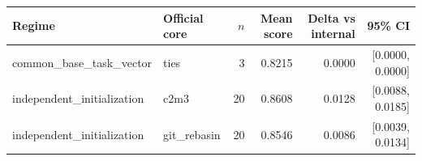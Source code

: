 \begin{tabular}{llrrrr}
\toprule
Regime & Official core & $n$ & Mean score & Delta vs internal & 95\% CI \\
\midrule
common\_base\_task\_vector & ties & 3 & 0.8215 & 0.0000 & [0.0000, 0.0000] \\
independent\_initialization & c2m3 & 20 & 0.8608 & 0.0128 & [0.0088, 0.0185] \\
independent\_initialization & git\_rebasin & 20 & 0.8546 & 0.0086 & [0.0039, 0.0134] \\
\bottomrule
\end{tabular}

